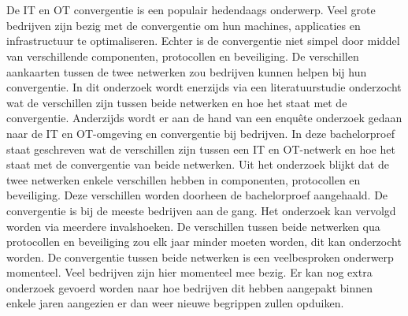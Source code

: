\chapter*{}
De IT en OT convergentie is een populair hedendaags onderwerp. Veel grote bedrijven zijn bezig met de convergentie om hun machines, applicaties en infrastructuur te optimaliseren. Echter is de convergentie niet simpel door middel van verschillende componenten, protocollen en beveiliging. De verschillen aankaarten tussen de twee netwerken zou bedrijven kunnen helpen bij hun convergentie. In dit onderzoek wordt enerzijds via een literatuurstudie onderzocht wat de verschillen zijn tussen beide netwerken en hoe het staat met de convergentie. Anderzijds wordt er aan de hand van een enquête onderzoek gedaan naar de IT en OT-omgeving en convergentie bij bedrijven. In deze bachelorproef staat geschreven wat de verschillen zijn tussen een IT en OT-netwerk en hoe het staat met de convergentie van beide netwerken. Uit het onderzoek blijkt dat de twee netwerken enkele verschillen hebben in componenten, protocollen en beveiliging. Deze verschillen worden doorheen de bachelorproef aangehaald. De convergentie is bij de meeste bedrijven aan de gang. Het onderzoek kan vervolgd worden via meerdere invalshoeken. De verschillen tussen beide netwerken qua protocollen en beveiliging zou elk jaar minder moeten worden, dit kan onderzocht worden. De convergentie tussen beide netwerken is een veelbesproken onderwerp momenteel. Veel bedrijven zijn hier momenteel mee bezig. Er kan nog extra onderzoek gevoerd worden naar hoe bedrijven dit hebben aangepakt binnen enkele jaren aangezien er dan weer nieuwe begrippen zullen opduiken.
